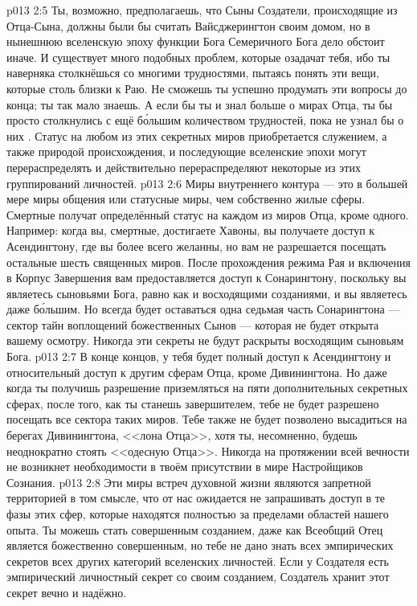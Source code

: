 \vs p013 2:5 \pc Ты, возможно, предполагаешь, что Сыны Создатели, происходящие из Отца\hyp{}Сына, должны были бы считать Вайсджерингтон своим домом, но в нынешнюю вселенскую эпоху функции Бога Семеричного Бога дело обстоит иначе. И существует много подобных проблем, которые озадачат тебя, ибо ты наверняка столкнёшься со многими трудностями, пытаясь понять эти вещи, которые столь близки к Раю. Не сможешь ты успешно продумать эти вопросы до конца; ты так мало знаешь. А если бы ты и знал больше о мирах Отца, ты бы просто столкнулись с ещё б\'ольшим количеством трудностей, пока не узнал бы о них . Статус на любом из этих секретных миров приобретается служением, а также природой происхождения, и последующие вселенские эпохи могут перераспределять и действительно перераспределяют некоторые из этих группирований личностей.
\vs p013 2:6 \pc Миры внутреннего контура --- это в большей мере миры общения или статусные миры, чем собственно жилые сферы. Смертные получат определённый статус на каждом из миров Отца, кроме одного. Например: когда вы, смертные, достигаете Хавоны, вы получаете доступ к Асендингтону, где вы более всего желанны, но вам не разрешается посещать остальные шесть священных миров. После прохождения режима Рая и включения в Корпус Завершения вам предоставляется доступ к Сонарингтону, поскольку вы являетесь сыновьями Бога, равно как и восходящими созданиями, и вы являетесь даже б\'ольшим. Но всегда будет оставаться одна седьмая часть Сонарингтона --- сектор тайн воплощений божественных Сынов --- которая не будет открыта вашему осмотру. Никогда эти секреты не будут раскрыты восходящим сыновьям Бога.
\vs p013 2:7 В конце концов, у тебя будет полный доступ к Асендингтону и относительный доступ к другим сферам Отца, кроме Дивинингтона. Но даже когда ты получишь разрешение приземляться на пяти дополнительных секретных сферах, после того, как ты станешь завершителем, тебе не будет разрешено посещать все сектора таких миров. Тебе также не будет позволено высадиться на берегах Дивинингтона, <<лона Отца>>, хотя ты, несомненно, будешь неоднократно стоять <<одесную Отца>>. Никогда на протяжении всей вечности не возникнет необходимости в твоём присутствии в мире Настройщиков Сознания.
\vs p013 2:8 Эти миры встреч духовной жизни являются запретной территорией в том смысле, что от нас ожидается не запрашивать доступ в те фазы этих сфер, которые находятся полностью за пределами областей нашего опыта. Ты можешь стать совершенным созданием, даже как Всеобщий Отец является божественно совершенным, но тебе не дано знать всех эмпирических секретов всех других категорий вселенских личностей. Если у Создателя есть эмпирический личностный секрет со своим созданием, Создатель хранит этот секрет вечно и надёжно.

